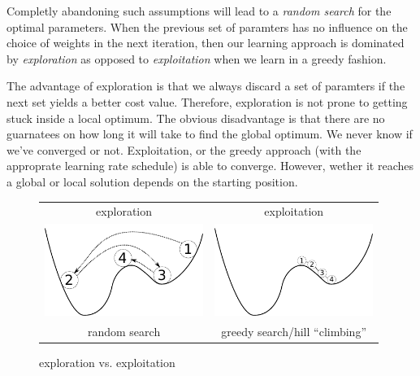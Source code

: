 Completly abandoning such assumptions will lead to a \emph{random search} for the optimal parameters. When the previous set of paramters has no influence on the choice of weights in the next iteration, 
then our learning approach is dominated by \emph{exploration} as opposed to \emph{exploitation} when we learn in a greedy fashion.


The advantage of exploration is that we always discard a set of paramters if the next set yields a better cost value. Therefore, exploration is not prone to getting stuck inside a local optimum. The obvious disadvantage is that there are no guarnatees on how long it will take to find the global optimum. We never know if we've converged or not. Exploitation, or the greedy approach (with the approprate learning rate schedule) is able to converge. However, wether it reaches a global or local solution depends on the starting position.

\begin{frame}
\begin{figure}[ht]
  \begin{tabular}{c c}
		exploration & exploitation\\
      \includegraphics[height=3.0cm]{img/exploration.pdf} &
      \includegraphics[height=3.0cm]{img/exploitation.pdf}\\
      random search & greedy search/hill ``climbing''
      \end{tabular}
  \caption{exploration vs. exploitation}
  \label{fig:exploration-exploitation}
\end{figure}

\end{frame}

